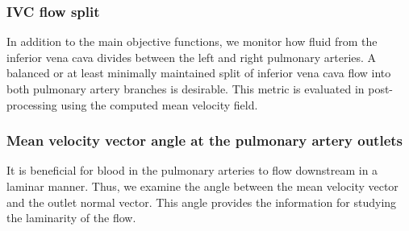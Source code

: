 \subsubsection*{IVC flow split}
In addition to the main objective functions, we monitor how fluid from the inferior vena cava divides between the left and right pulmonary arteries. A balanced or at least minimally maintained split of inferior vena cava flow into both pulmonary artery branches is desirable. This metric is evaluated in post-processing using the computed mean velocity field.

\subsubsection*{Mean velocity vector angle at the pulmonary artery outlets}
It is beneficial for blood in the pulmonary arteries to flow downstream in a laminar manner. Thus, we examine the angle between the mean velocity vector and the outlet normal vector. This angle provides the information  for studying the laminarity of the flow.
